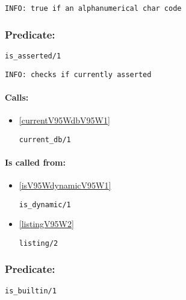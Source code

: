 {\small \begin{verbatim}
INFO: true if an alphanumerical char code

\end{verbatim}}

\subsubsection{Predicate:} \label{isV95WassertedV95W1}

\begin{verbatim}
is_asserted/1
\end{verbatim}

{\small \begin{verbatim}
INFO: checks if currently asserted

\end{verbatim}}
\paragraph{Calls:} 
\begin{itemize}
\item \ref{currentV95WdbV95W1} 
\begin{verbatim}
current_db/1
\end{verbatim}

\end{itemize}
\paragraph{Is called from:} 
\begin{itemize}
\item \ref{isV95WdynamicV95W1} 
\begin{verbatim}
is_dynamic/1
\end{verbatim}

\item \ref{listingV95W2} 
\begin{verbatim}
listing/2
\end{verbatim}

\end{itemize}

\subsubsection{Predicate:} \label{isV95WbuiltinV95W1}

\begin{verbatim}
is_builtin/1
\end{verbatim}

